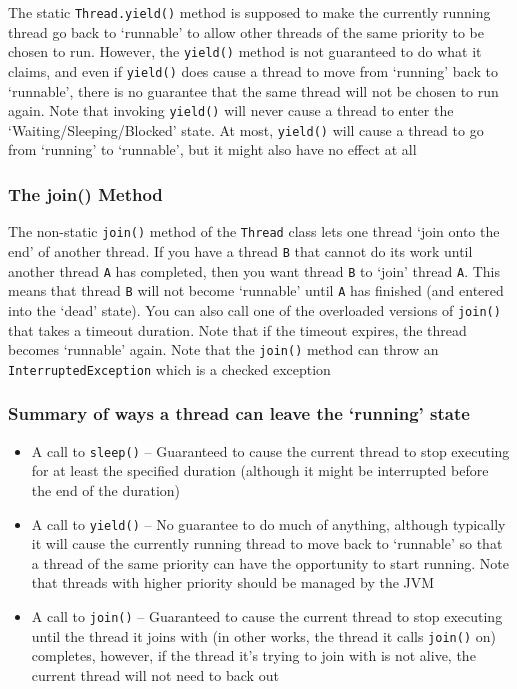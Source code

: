 The static \verb#Thread.yield()# method is supposed to make the currently 
running thread go back to `runnable' to allow other threads of the same 
priority to be chosen to run. However, the \verb#yield()# method is not 
guaranteed to do what it claims, and even if \verb#yield()# does cause a thread 
to move from `running' back to `runnable', there is no guarantee that the same 
thread will not be chosen to run again. Note that invoking \verb#yield()# will 
never cause a thread to enter the `Waiting/Sleeping/Blocked' state. At most, 
\verb#yield()# will cause a thread to go from `running' to `runnable', but it 
might also have no effect at all

\subsubsection{The join() Method}
The non-static \verb#join()# method of the \verb#Thread# class lets one thread 
`join onto the end' of another thread. If you have a thread \verb#B# that 
cannot do its work until another thread \verb#A# has completed, then you want 
thread \verb#B# to `join' thread \verb#A#. This means that thread \verb#B# will 
not become `runnable' until \verb#A# has finished (and entered into the `dead' 
state). You can also call one of the overloaded versions of \verb#join()# that 
takes a timeout duration. Note that if the timeout expires, the thread becomes 
`runnable' again. Note that the \verb#join()# method can throw an 
\verb#InterruptedException# which is a checked exception

\subsubsection{Summary of ways a thread can leave the `running' state}
\begin{itemize}
    \item A call to \verb#sleep()# -- Guaranteed to cause the current thread to 
    stop executing for at least the specified duration (although it might be 
    interrupted before the end of the duration)
    \item A call to \verb#yield()# -- No guarantee to do much of anything, 
    although typically it will cause the currently running thread to move back 
    to `runnable' so that a thread of the same priority can have the 
    opportunity to start running. Note that threads with higher priority should 
    be managed by the JVM
    \item A call to \verb#join()# -- Guaranteed to cause the current thread to 
    stop executing until the thread it joins with (in other works, the thread 
    it calls \verb#join()# on) completes, however, if the thread it's trying to 
    join with is not alive, the current thread will not need to back out
\end{itemize}

